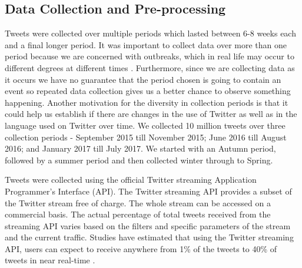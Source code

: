 \documentclass[10pt,letterpaper]{article}
\begin{document}
\subsection{Data Collection and Pre-processing}
Tweets were collected over multiple periods which lasted between 6-8 weeks each and a final longer period. It was important to collect data over more than one period because we are concerned with outbreaks, which in real life may occur to different degrees at different times \cite{REF28,REF29,REF30}. Furthermore, since we are collecting data as it occurs we have no guarantee that the period chosen is going to contain an event so repeated data collection gives us a better chance to observe something happening.   %
Another motivation for the diversity in collection periods is that it could help us establish if there are changes in the use of Twitter as well as in the language used on Twitter over time.   We collected 10 million tweets over three collection periods - September 2015 till November 2015; June 2016 till August 2016; and January 2017 till July 2017.  We started with an Autumn period, followed by a summer period and then collected winter through to Spring.  %

Tweets were collected using the official Twitter streaming Application Programmer's Interface (API). The Twitter streaming API provides a subset of the Twitter stream free of charge.   The whole stream can be accessed on a commercial basis. The actual percentage of total tweets received from the streaming API varies based on the filters and specific parameters of the stream and the current traffic. Studies have estimated that using the Twitter streaming API, users can expect to receive anywhere from 1\% of the tweets to 40\% of tweets in near real-time \cite{REF31}.  
\end{document}
